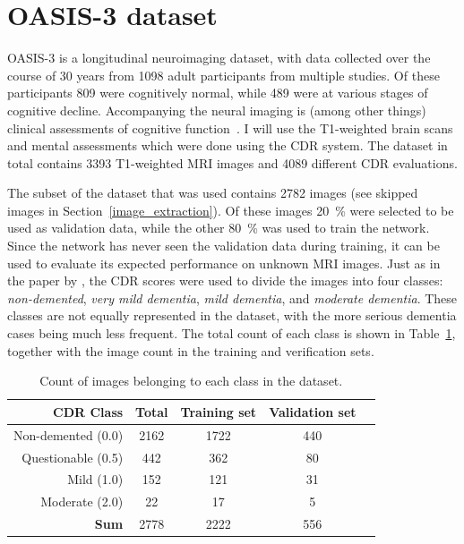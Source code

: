 \documentclass{kththesis}
\begin{document}
\section{OASIS-3 dataset} \label{dataset}
OASIS-3 is a longitudinal neuroimaging dataset, with data collected over the course of 30 years from 1098 adult participants from multiple studies. Of these participants 809 were cognitively normal, while 489 were at various stages of cognitive decline. Accompanying the neural imaging is (among other things) clinical assessments of cognitive function~\cite{oasis3}. I will use the T1-weighted brain scans and mental assessments which were done using the CDR system. The dataset in total contains 3393 T1-weighted MRI images and 4089 different CDR evaluations.

The subset of the dataset that was used contains 2782 images (see skipped images in Section~\ref{image_extraction}). Of these images 20~\% were selected to be used as validation data, while the other 80~\% was used to train the network. Since the network has never seen the validation data during training, it can be used to evaluate its expected performance on unknown MRI images. Just as in the paper by \textcite{islam2018early}, the CDR scores were used to divide the images into four classes: \textit{non-demented}, \textit{very mild dementia}, \textit{mild dementia}, and \textit{moderate dementia}. These classes are not equally represented in the dataset, with the more serious dementia cases being much less frequent. The total count of each class is shown in Table~\ref{tab:dataset_contents}, together with the image count in the training and verification sets.

\begin{table}[h]
  \begin{center}
    \caption{Count of images belonging to each class in the dataset.\label{tab:dataset_contents}}
    \begin{tabular}{r|cccc}
      \textbf{CDR Class} & \textbf{Total} & \textbf{Training set} & \textbf{Validation set} \\
      \toprule
      Non-demented (0.0) & 2162 & 1722 & 440 \\
      Questionable (0.5) & 442 & 362 & 80 \\
      Mild (1.0) & 152 & 121 & 31 \\
      Moderate (2.0) & 22 & 17 & 5 \\
      \bottomrule
      \textbf{Sum} & 2778 & 2222 & 556 \\
    \end{tabular}
  \end{center}
\end{table}
\end{document}
